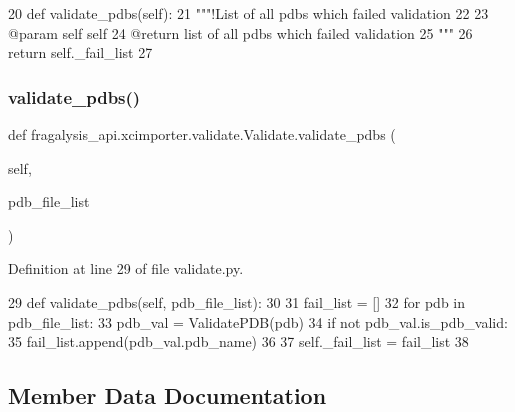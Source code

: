 \begin{DoxyCode}
20     \textcolor{keyword}{def }validate\_pdbs(self):
21         \textcolor{stringliteral}{"""!List of all pdbs which failed validation}
22 \textcolor{stringliteral}{}
23 \textcolor{stringliteral}{        @param self self}
24 \textcolor{stringliteral}{        @return list of all pdbs which failed validation}
25 \textcolor{stringliteral}{        """}
26         \textcolor{keywordflow}{return} self.\_fail\_list
27 
\end{DoxyCode}
\mbox{\label{classfragalysis__api_1_1xcimporter_1_1validate_1_1_validate_a2efb516ce319ed46c758ffbf70056df1}} 
\subsubsection{\texorpdfstring{validate\+\_\+pdbs()}{validate\_pdbs()}\hspace{0.1cm}{\footnotesize\ttfamily [2/2]}}
{\footnotesize\ttfamily def fragalysis\+\_\+api.\+xcimporter.\+validate.\+Validate.\+validate\+\_\+pdbs (\begin{DoxyParamCaption}\item[{}]{self,  }\item[{}]{pdb\+\_\+file\+\_\+list }\end{DoxyParamCaption})}



Definition at line 29 of file validate.\+py.


\begin{DoxyCode}
29     \textcolor{keyword}{def }validate\_pdbs(self, pdb\_file\_list):
30 
31         fail\_list = []
32         \textcolor{keywordflow}{for} pdb \textcolor{keywordflow}{in} pdb\_file\_list:
33             pdb\_val = ValidatePDB(pdb)
34             \textcolor{keywordflow}{if} \textcolor{keywordflow}{not} pdb\_val.is\_pdb\_valid:
35                 fail\_list.append(pdb\_val.pdb\_name)
36 
37         self.\_fail\_list = fail\_list
38 
\end{DoxyCode}


\subsection{Member Data Documentation}
\mbox{\label{classfragalysis__api_1_1xcimporter_1_1validate_1_1_validate_a4ef4b2db6e032059c04e6dead4a8998f}} 
